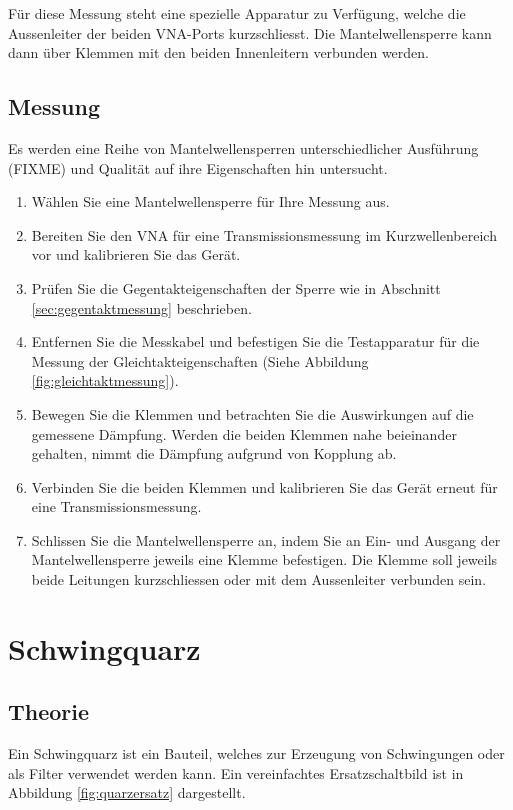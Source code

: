 \documentclass[twoside,a4paper,11pt,halfparskip,DIV=11,notitlepage]{scrartcl}
\begin{document}
Für diese Messung steht eine spezielle Apparatur zu Verfügung, welche die
Aussenleiter der beiden VNA-Ports kurzschliesst. Die Mantelwellensperre
kann dann über  Klemmen mit den beiden Innenleitern verbunden werden.

\subsection{Messung}
Es werden eine Reihe von Mantelwellensperren unterschiedlicher Ausführung
(FIXME) und Qualität auf ihre Eigenschaften hin untersucht. 

\begin{enumerate}
    \item Wählen Sie eine Mantelwellensperre für Ihre Messung aus.
    \item Bereiten Sie den VNA für eine Transmissionsmessung im Kurzwellenbereich vor und kalibrieren Sie das Gerät.
    \item Prüfen Sie die Gegentakteigenschaften der Sperre wie in Abschnitt \ref{sec:gegentaktmessung} beschrieben.
    \item Entfernen Sie die Messkabel und befestigen Sie die Testapparatur für die Messung der Gleichtakteigenschaften (Siehe Abbildung \ref{fig:gleichtaktmessung}). %
    \item Bewegen Sie die Klemmen und betrachten Sie die Auswirkungen auf die gemessene Dämpfung. Werden die beiden Klemmen nahe beieinander gehalten, nimmt die Dämpfung aufgrund von Kopplung ab.
    \item Verbinden Sie die beiden Klemmen und kalibrieren Sie das Gerät erneut für eine Transmissionsmessung.
    \item Schlissen Sie die Mantelwellensperre an, indem Sie an Ein- und Ausgang der Mantelwellensperre jeweils eine Klemme befestigen. Die Klemme soll jeweils beide Leitungen kurzschliessen oder mit dem Aussenleiter verbunden sein.
\end{enumerate}

\section{Schwingquarz}

\subsection{Theorie}
Ein Schwingquarz ist ein Bauteil, welches zur Erzeugung von Schwingungen oder
als Filter verwendet werden kann. Ein vereinfachtes Ersatzschaltbild ist in
Abbildung \ref{fig:quarzersatz} dargestellt. 
\end{document}

